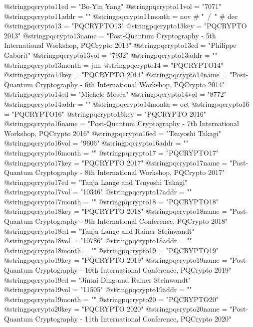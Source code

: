 @string{pqcrypto11ed =          "Bo-Yin Yang"}
@string{pqcrypto11vol =         "7071"}
@string{pqcrypto11addr =        ""}
@string{pqcrypto11month =       nov # "~/~" # dec}
@string{pqcrypto13 =            "PQCRYPTO13"}
@string{pqcrypto13key =         "PQCRYPTO 2013"}
@string{pqcrypto13name =        "Post-Quantum Cryptography - 5th International Workshop, PQCrypto 2013"}
@string{pqcrypto13ed =          "Philippe Gaborit"}
@string{pqcrypto13vol =         "7932"}
@string{pqcrypto13addr =        ""}
@string{pqcrypto13month =       jun}
@string{pqcrypto14 =            "PQCRYPTO14"}
@string{pqcrypto14key =         "PQCRYPTO 2014"}
@string{pqcrypto14name =        "Post-Quantum Cryptography - 6th International Workshop, PQCrypto 2014"}
@string{pqcrypto14ed =          "Michele Mosca"}
@string{pqcrypto14vol =         "8772"}
@string{pqcrypto14addr =        ""}
@string{pqcrypto14month =       oct}
@string{pqcrypto16 =            "PQCRYPTO16"}
@string{pqcrypto16key =         "PQCRYPTO 2016"}
@string{pqcrypto16name =        "Post-Quantum Cryptography - 7th International Workshop, PQCrypto 2016"}
@string{pqcrypto16ed =          "Tsuyoshi Takagi"}
@string{pqcrypto16vol =         "9606"}
@string{pqcrypto16addr =        ""}
@string{pqcrypto16month =       ""}
@string{pqcrypto17 =            "PQCRYPTO17"}
@string{pqcrypto17key =         "PQCRYPTO 2017"}
@string{pqcrypto17name =        "Post-Quantum Cryptography - 8th International Workshop, PQCrypto 2017"}
@string{pqcrypto17ed =          "Tanja Lange and Tsuyoshi Takagi"}
@string{pqcrypto17vol =         "10346"}
@string{pqcrypto17addr =        ""}
@string{pqcrypto17month =       ""}
@string{pqcrypto18 =            "PQCRYPTO18"}
@string{pqcrypto18key =         "PQCRYPTO 2018"}
@string{pqcrypto18name =        "Post-Quantum Cryptography - 9th International Conference, PQCrypto 2018"}
@string{pqcrypto18ed =          "Tanja Lange and Rainer Steinwandt"}
@string{pqcrypto18vol =         "10786"}
@string{pqcrypto18addr =        ""}
@string{pqcrypto18month =       ""}
@string{pqcrypto19 =            "PQCRYPTO19"}
@string{pqcrypto19key =         "PQCRYPTO 2019"}
@string{pqcrypto19name =        "Post-Quantum Cryptography - 10th International Conference, PQCrypto 2019"}
@string{pqcrypto19ed =          "Jintai Ding and Rainer Steinwandt"}
@string{pqcrypto19vol =         "11505"}
@string{pqcrypto19addr =        ""}
@string{pqcrypto19month =       ""}
@string{pqcrypto20 =            "PQCRYPTO20"}
@string{pqcrypto20key =         "PQCRYPTO 2020"}
@string{pqcrypto20name =        "Post-Quantum Cryptography - 11th International Conference, PQCrypto 2020"}
